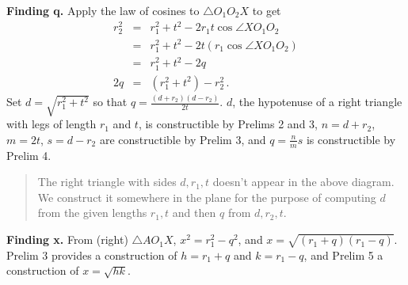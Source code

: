 \documentclass[11pt,a4paper]{article}
\newcommand*{\qed}{%
$\quad\quad$\raisebox{2pt}{\framebox[10pt]{\rule{0pt}{4pt}}}%
}
\begin{document}
\textbf{Finding q.} Apply the law of cosines to $\triangle O_1O_2X$ to get
\[
\renewcommand*{\arraystretch}{1.8}
\begin{array}{rcl}
r_2^2 &=& r_1^2 + t^2 - 2r_1t\cos\angle XO_1O_2\\
      &=& r_1^2 + t^2 - 2t(r_1\cos\angle XO_1O_2)\\
&=& r_1^2 + t^2 - 2q\\
2q &=& (r_1^2+t^2) - r_2^2\,.
\end{array}
\]
Set $d=\sqrt{r_1^2+t^2}$ so that $q=\frac{(d+r_2)(d-r_2)}{2t}$. $d$, the hypotenuse of a right triangle with legs of length $r_1$ and $t$, is constructible by Prelims 2 and 3, $n= d+ r_2$, $m= 2t$, $s =d -r_2$ are constructible by Prelim 3, and $q=\frac{n}{m}s$ is constructible by Prelim 4.
\begin{quote}
\vspace*{-8pt}
The right triangle with sides $d,r_1,t$ doesn't appear in the above diagram. We construct it somewhere in the plane for the purpose of computing $d$ from the given lengths $r_1,t$ and then $q$ from $d,r_2,t$. 
\vspace*{-8pt}
\end{quote}
\textbf{Finding x.} From (right) $\triangle AO_1X$, $x^2=r_1^2-q^2$, and $x=\sqrt{(r_1+q)(r_1-q)}$. Prelim 3 provides a construction of $h =r_1+ q$ and $k= r_1 - q$, and Prelim 5 a construction of $x= \sqrt{hk}$. \qed
\end{document}
